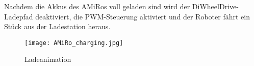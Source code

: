 Nachdem die Akkus des AMiRos voll geladen sind wird der DiWheelDrive-Ladepfad deaktiviert, die PWM-Steuerung aktiviert und der Roboter fährt ein Stück aus der Ladestation heraus.

\begin{figure}[]
	\begin{center}
		\texttt{[image: AMiRo\_charging.jpg]} 	
		\caption{Ladeanimation}
		\label{fig:amiro_charging}
	\end{center}
\end{figure}




